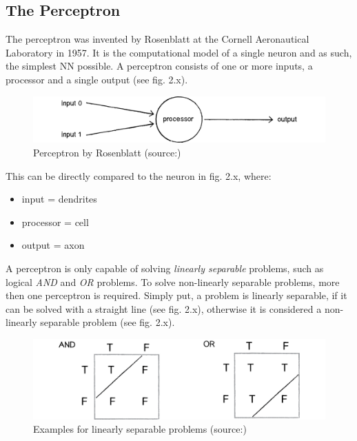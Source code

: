 \subsection{The Perceptron}
The perceptron was invented by Rosenblatt at the Cornell Aeronautical Laboratory in 1957\cite{Rosenblatt58}. It is the computational model of a single neuron and as such, the simplest NN possible\cite{Shiffman12}. A perceptron consists of one or more inputs, a processor and a single output (see fig. 2.x)\cite{Rosenblatt58}.

\begin{figure}[H]
	\begin{center}
		\includegraphics[scale=0.7]{img/perceptron.png}
		\caption{Perceptron by Rosenblatt (source:\cite{Shiffman12})}
		\label{fig:fig2.5}
	\end{center}
\end{figure}

This can be directly compared to the neuron in fig. 2.x, where:
\begin{itemize}
	\item input = dendrites
	\item processor = cell
	\item output = axon
\end{itemize}

A perceptron is only capable of solving \emph{linearly separable} problems, such as logical \emph{AND} and \emph{OR} problems. To solve non-linearly separable problems, more then one perceptron is required\cite{Rosenblatt58}. Simply put, a problem is linearly separable, if it can be solved with a straight line (see fig. 2.x), otherwise it is considered a non-linearly separable problem (see fig. 2.x).

\begin{figure}[H]
	\begin{center}
		\includegraphics[scale=0.6]{img/lsp.png}
		\caption{Examples for linearly separable problems (source:\cite{Shiffman12})}
		\label{fig:fig2.7}
	\end{center}
\end{figure}

